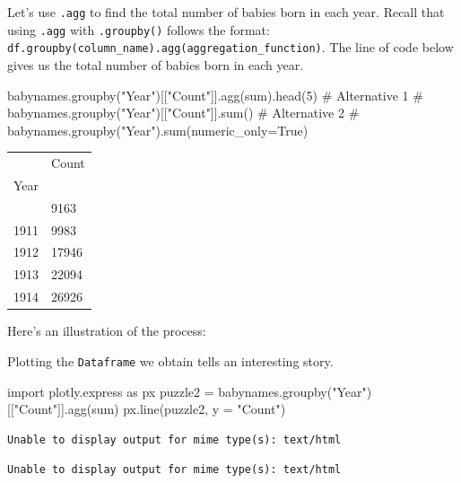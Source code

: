 \documentclass[
  letterpaper,
  DIV=11,
  numbers=noendperiod]{scrreprt}
\newenvironment{Shaded}{\begin{snugshade}}{\end{snugshade}}
\newcommand{\BuiltInTok}[1]{\textcolor[rgb]{0.00,0.23,0.31}{#1}}
\newcommand{\CommentTok}[1]{\textcolor[rgb]{0.37,0.37,0.37}{#1}}
\newcommand{\DecValTok}[1]{\textcolor[rgb]{0.68,0.00,0.00}{#1}}
\newcommand{\ImportTok}[1]{\textcolor[rgb]{0.00,0.46,0.62}{#1}}
\newcommand{\NormalTok}[1]{\textcolor[rgb]{0.00,0.23,0.31}{#1}}
\newcommand{\OperatorTok}[1]{\textcolor[rgb]{0.37,0.37,0.37}{#1}}
\newcommand{\StringTok}[1]{\textcolor[rgb]{0.13,0.47,0.30}{#1}}
\begin{document}
Let's use \texttt{.agg} to find the total number of babies born in each
year. Recall that using \texttt{.agg} with \texttt{.groupby()} follows
the format:
\texttt{df.groupby(column\_name).agg(aggregation\_function)}. The line
of code below gives us the total number of babies born in each year.

\begin{Shaded}
\begin{Highlighting}[]
\NormalTok{babynames.groupby(}\StringTok{"Year"}\NormalTok{)[[}\StringTok{"Count"}\NormalTok{]].agg(}\BuiltInTok{sum}\NormalTok{).head(}\DecValTok{5}\NormalTok{)}
\CommentTok{\# Alternative 1}
\CommentTok{\# babynames.groupby("Year")[["Count"]].sum()}
\CommentTok{\# Alternative 2}
\CommentTok{\# babynames.groupby("Year").sum(numeric\_only=True)}
\end{Highlighting}
\end{Shaded}

\begin{longtable}[]{@{}ll@{}}
\toprule\noalign{}
& Count \\
Year & \\
\midrule\noalign{}
\endhead
\bottomrule\noalign{}
\endlastfoot
1910 & 9163 \\
1911 & 9983 \\
1912 & 17946 \\
1913 & 22094 \\
1914 & 26926 \\
\end{longtable}

Here's an illustration of the process:

Plotting the \texttt{Dataframe} we obtain tells an interesting story.

\begin{Shaded}
\begin{Highlighting}[]
\ImportTok{import}\NormalTok{ plotly.express }\ImportTok{as}\NormalTok{ px}
\NormalTok{puzzle2 }\OperatorTok{=}\NormalTok{ babynames.groupby(}\StringTok{"Year"}\NormalTok{)[[}\StringTok{"Count"}\NormalTok{]].agg(}\BuiltInTok{sum}\NormalTok{)}
\NormalTok{px.line(puzzle2, y }\OperatorTok{=} \StringTok{"Count"}\NormalTok{)}
\end{Highlighting}
\end{Shaded}

\begin{verbatim}
Unable to display output for mime type(s): text/html
\end{verbatim}

\begin{verbatim}
Unable to display output for mime type(s): text/html
\end{verbatim}
\end{document}

